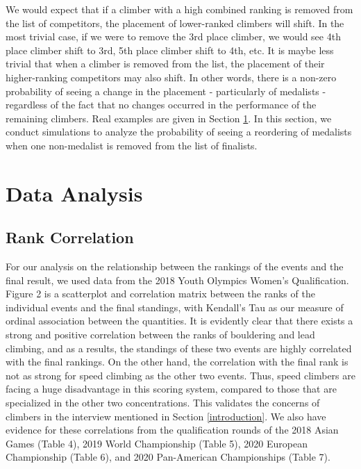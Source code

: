 \documentclass[12pt]{article}
\begin{document}
We would expect that if a climber with a high combined ranking is
removed from the list of competitors, the placement of lower-ranked
climbers will shift. In the most trivial case, if we were to remove the
3rd place climber, we would see 4th place climber shift to 3rd, 5th
place climber shift to 4th, etc. It is maybe less trivial that when a
climber is removed from the list, the placement of their higher-ranking
competitors may also shift. In other words, there is a non-zero
probability of seeing a change in the placement - particularly of
medalists - regardless of the fact that no changes occurred in the
performance of the remaining climbers. Real examples are given in
Section \ref{data-analysis}. In this section, we conduct simulations to
analyze the probability of seeing a reordering of medalists when one
non-medalist is removed from the list of finalists.

\hypertarget{data-analysis}{%
\section{Data Analysis}\label{data-analysis}}

\hypertarget{rank-correlation}{%
\subsection{Rank Correlation}\label{rank-correlation}}

For our analysis on the relationship between the rankings of the events
and the final result, we used data from the 2018 Youth Olympics Women's
Qualification. Figure 2 is a scatterplot and correlation matrix between
the ranks of the individual events and the final standings, with
Kendall's Tau \citep{kendall1938} as our measure of ordinal association
between the quantities. It is evidently clear that there exists a strong
and positive correlation between the ranks of bouldering and lead
climbing, and as a results, the standings of these two events are highly
correlated with the final rankings. On the other hand, the correlation
with the final rank is not as strong for speed climbing as the other two
events. Thus, speed climbers are facing a huge disadvantage in this
scoring system, compared to those that are specialized in the other two
concentrations. This validates the concerns of climbers in the interview
mentioned in Section \ref{introduction}. We also have evidence for these
correlations from the qualification rounds of the 2018 Asian Games
(Table 4), 2019 World Championship (Table 5), 2020 European Championship
(Table 6), and 2020 Pan-American Championships (Table 7).
\end{document}
